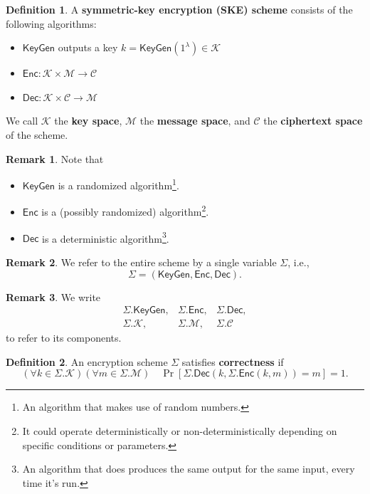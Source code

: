 \documentclass[12pt,openany]{book}
\theoremstyle{definition}
\newtheorem{definition}{Definition}[chapter]
\newtheorem{remark}{Remark}[chapter]
\newcommand{\ie}{\textnormal{i.e.}}
\newcommand{\KeyGen}{\mathsf{KeyGen}}
\newcommand{\Enc}{\mathsf{Enc}}
\newcommand{\Dec}{\mathsf{Dec}}
\newcommand{\scheme}{\Sigma}
\newcommand{\keyspace}{\mathcal{K}}
\newcommand{\messagespace}{\mathcal{M}}
\newcommand{\ciphertextspace}{\mathcal{C}}
\begin{document}
	\begin{tcolorbox}[colback=white,colframe=defcolor,arc=5pt,title={\color{white}\bf Encryption Syntax}]
		\begin{definition}
			A \textbf{symmetric-key encryption (SKE) scheme} consists of the following algorithms: \begin{itemize}
				\item $\KeyGen$ outputs a key $k=\KeyGen(1^\lambda)\in\keyspace$
				\item $\Enc:\keyspace\times\messagespace\to\ciphertextspace$
				\item $\Dec:\keyspace\times\ciphertextspace\to\messagespace$
			\end{itemize} We call $\keyspace$ the \textbf{key space}, $\messagespace$ the \textbf{message space}, and $\ciphertextspace$ the \textbf{ciphertext space} of the scheme.
		\end{definition}
	\end{tcolorbox}
	\begin{remark}
		Note that \begin{itemize}
			\item \(\KeyGen\) is a randomized algorithm\footnote{An algorithm that makes use of random numbers.}.
			\item \(\Enc\) is a (possibly randomized) algorithm\footnote{It could operate deterministically or non-deterministically depending on specific conditions or parameters.}.
			\item \(\Dec\) is a deterministic algorithm\footnote{An algorithm that does produces the same output for the same input, every time it's run.}.
		\end{itemize}
	\end{remark}
	\begin{remark}
		We refer to the entire scheme by a single variable $\scheme$, \ie, $$
		\scheme=(\KeyGen, \Enc, \Dec).
		$$
	\end{remark}
	\begin{remark}
		We write \[
		\begin{array}{ccc}
			\scheme.\KeyGen, & \scheme.\Enc, & \scheme.\Dec,\\
			\scheme.\keyspace, & \scheme.\messagespace, &\scheme.\ciphertextspace
		\end{array}
		\] to refer to its components.
	\end{remark}
	\vspace{8pt}
	\begin{tcolorbox}[colback=white,colframe=defcolor,arc=5pt,title={\color{white}\bf SKE Correctness}]
		\begin{definition}
			An encryption scheme $\scheme$ satisfies \textbf{correctness} if \[
			\left(\forall k\in\scheme.\keyspace\right)\left(\forall m\in\scheme.\messagespace
			\right)\quad\Pr\left[\scheme.\Dec(k, \scheme.\Enc(k,m))=m\right]=1.
			\]
		\end{definition}
	\end{tcolorbox}
\end{document}
